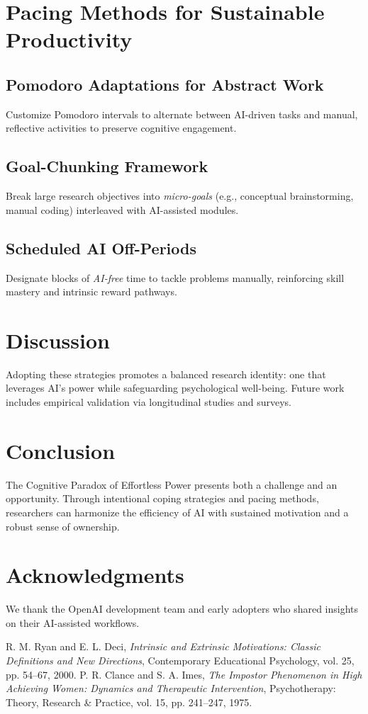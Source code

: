 \documentclass[11pt]{article}
\begin{document}
\section{Pacing Methods for Sustainable Productivity}
\subsection{Pomodoro Adaptations for Abstract Work}
Customize Pomodoro intervals to alternate between AI-driven tasks and manual, reflective activities to preserve cognitive engagement.

\subsection{Goal-Chunking Framework}
Break large research objectives into \emph{micro-goals} (e.g., conceptual brainstorming, manual coding) interleaved with AI-assisted modules.

\subsection{Scheduled AI Off-Periods}
Designate blocks of \emph{AI-free} time to tackle problems manually, reinforcing skill mastery and intrinsic reward pathways.

\section{Discussion}
Adopting these strategies promotes a balanced research identity: one that leverages AI’s power while safeguarding psychological well-being. Future work includes empirical validation via longitudinal studies and surveys.

\section{Conclusion}
The Cognitive Paradox of Effortless Power presents both a challenge and an opportunity. Through intentional coping strategies and pacing methods, researchers can harmonize the efficiency of AI with sustained motivation and a robust sense of ownership.

\section*{Acknowledgments}
We thank the OpenAI development team and early adopters who shared insights on their AI-assisted workflows.

\begin{thebibliography}{9}
 R. M. Ryan and E. L. Deci, \emph{Intrinsic and Extrinsic Motivations: Classic Definitions and New Directions}, Contemporary Educational Psychology, vol. 25, pp. 54--67, 2000.
 P. R. Clance and S. A. Imes, \emph{The Impostor Phenomenon in High Achieving Women: Dynamics and Therapeutic Intervention}, Psychotherapy: Theory, Research \& Practice, vol. 15, pp. 241--247, 1975.
\end{thebibliography}
\end{document}
